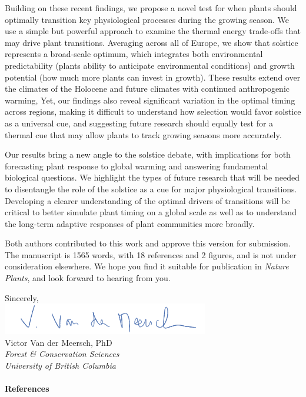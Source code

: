 \documentclass[11pt,a4paper]{article}
\begin{document}
\noindent Building on these recent findings, we propose a novel test for when plants should optimally transition key physiological processes during the growing season. We use a simple but powerful approach to  examine the thermal energy trade-offs that may drive plant transitions. %
Averaging across all of Europe, we show that solstice represents a broad-scale optimum, which integrates both environmental predictability (plants ability to anticipate environmental conditions) and growth potential (how much more plants can invest in growth). These results extend over the climates of the Holocene and future climates with continued anthropogenic warming, Yet, our findings also reveal significant variation in the optimal timing across regions, making it difficult to understand how selection would favor solstice as a universal cue, and suggesting future research should equally test for a thermal cue that may allow plants to track growing seasons more accurately.

\vspace{0.25cm}

\noindent Our results bring a new angle to the solstice debate, with implications for both forecasting plant response to global warming and answering fundamental biological questions. We highlight the types of future research that will be needed to disentangle the role of the solstice as a cue for major physiological transitions. Developing a clearer understanding of the optimal drivers of transitions will be critical to better simulate plant timing on a global scale as well as to understand the long-term adaptive responses of plant communities more broadly. 

\vspace{0.25cm}

\noindent Both authors contributed to this work and approve this version for submission. The manuscript is 1565 words, with 18 references and 2 figures, and is not under consideration elsewhere. We hope you find it suitable for publication in \emph{Nature Plants}, and look forward to hearing from you. 

\vspace{0.45cm}
\noindent Sincerely, 
\vspace{0.45cm}\\
\hspace*{-0.5cm}
\includegraphics[scale=.65]{sign_long.png} \\
\noindent Victor Van der Meersch, PhD\\
\noindent \emph{Forest \& Conservation Sciences}\\
\noindent \emph{University of British Columbia}

\clearpage

\paragraph{References}
\printbibliography[heading=none]


\newpage
\end{document}
